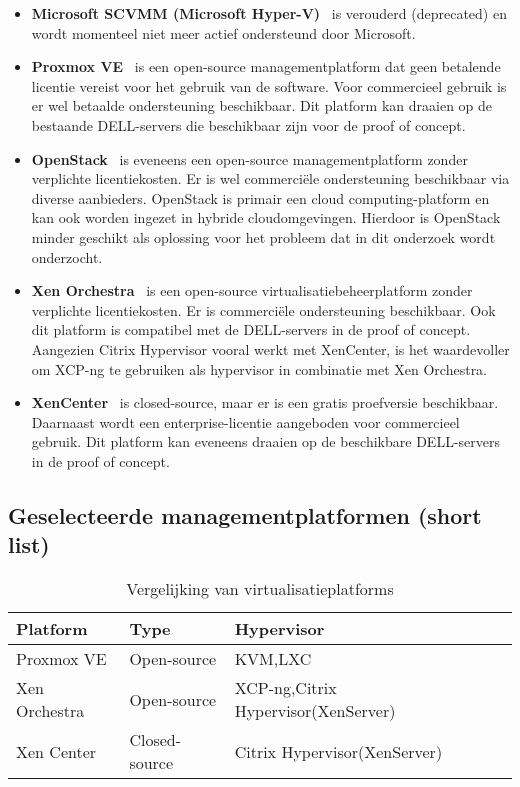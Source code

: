 \begin{itemize}
    \item \textbf{Microsoft SCVMM (Microsoft Hyper-V)}~\autocite{Eaton2019} is verouderd (deprecated) en wordt momenteel niet meer actief ondersteund door Microsoft.
    \item \textbf{Proxmox VE}~\autocite{Proxmox} is een open-source managementplatform dat geen betalende licentie vereist voor het gebruik van de software. Voor commercieel gebruik is er wel betaalde ondersteuning beschikbaar. Dit platform kan draaien op de bestaande DELL-servers die beschikbaar zijn voor de proof of concept.   
    \item \textbf{OpenStack}~\autocite{openstack2024} is eveneens een open-source managementplatform zonder verplichte licentiekosten. Er is wel commerciële ondersteuning beschikbaar via diverse aanbieders. OpenStack is primair een cloud computing-platform en kan ook worden ingezet in hybride cloudomgevingen. Hierdoor is OpenStack minder geschikt als oplossing voor het probleem dat in dit onderzoek wordt onderzocht.
    \item \textbf{Xen Orchestra}~\autocite{el2021server} is een open-source virtualisatiebeheerplatform zonder verplichte licentiekosten. Er is commerciële ondersteuning beschikbaar. Ook dit platform is compatibel met de DELL-servers in de proof of concept. Aangezien Citrix Hypervisor vooral werkt met XenCenter, is het waardevoller om XCP-ng te gebruiken als hypervisor in combinatie met Xen Orchestra. 
    \item \textbf{XenCenter}~\autocite{xencenter2024} is closed-source, maar er is een gratis proefversie beschikbaar. Daarnaast wordt een enterprise-licentie aangeboden voor commercieel gebruik. Dit platform kan eveneens draaien op de beschikbare DELL-servers in de proof of concept.
\end{itemize}

\subsection{Geselecteerde managementplatformen (short list)} 
\begin{table}[h!]
    \centering
    \begin{tabular}{|l|l|l|l|}
    \hline
    \textbf{Platform} & \textbf{Type} & \textbf{Hypervisor} \\ \hline
    Proxmox VE        & Open-source   & KVM,LXC             \\ \hline
    Xen Orchestra  & Open-source & XCP-ng,Citrix Hypervisor(XenServer) \\ \hline
    Xen Center  & Closed-source & Citrix Hypervisor(XenServer) \\ \hline
    \end{tabular}
    \caption{Vergelijking van virtualisatieplatforms}
\end{table}
\newpage
